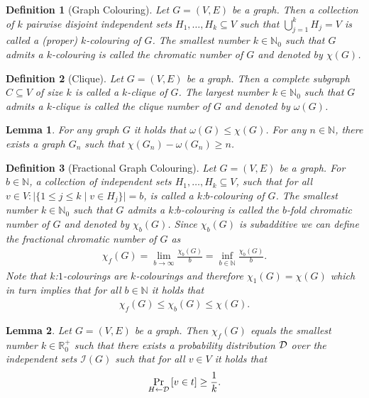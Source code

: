 \documentclass[12pt]{iopart}
\renewcommand{\1}{\mathds{1}}
\newtheorem{lemma}{Lemma}
\newtheorem{definition}{Definition}
\begin{document}
\begin{definition}[Graph Colouring]
  Let $G=(V,E)$ be a graph. Then a collection of $k$ pairwise disjoint independent sets $H_1, \dots, H_k \subseteq V$ such that $\bigcup_{j=1}^k H_j = V$ is called a \emph{(proper) $k$-colouring} of $G$. The smallest number $k\in\mathbb{N}_0$ such that $G$ admits a $k$-colouring is called the chromatic number of $G$ and denoted by $\chi(G)$.
\end{definition}

\begin{definition}[Clique]
  Let $G=(V,E)$ be a graph.
  Then a complete subgraph $C \subseteq V$ of size $k$ is called a $k$-\emph{clique} of $G$. The largest number $k\in\mathbb{N}_0$ such that $G$ admits a $k$-clique is called the clique number of $G$ and denoted by $\omega(G)$.
\end{definition}

\begin{lemma} \label{lem:gap}
  For any graph $G$ it holds that $\omega(G) \leq \chi(G)$.
  For any $n\in\mathbb{N}$, there exists a graph $G_n$ such that $\chi(G_n) - \omega(G_n) \geq n$.
\end{lemma}

\begin{definition}[Fractional Graph Colouring]\label{def:fractional_chromatic_number}
  Let $G=(V,E)$ be a graph. For $b \in \mathbb{N}$, a collection of independent sets $H_1, \dots, H_k \subseteq V$, such that for all $v \in V : |\{ 1 \leq j \leq k \; | \; v \in H_j \}| = b$, is called a \emph{$k$:$b$-colouring} of $G$.
  The smallest number $k \in \mathbb{N}_0$ such that $G$ admits a \emph{$k$:$b$-colouring} is called the $b$-fold chromatic number of $G$ and denoted by $\chi_b(G)$.
  Since $\chi_b(G)$ is subadditive we can define the \emph{fractional chromatic number} of $G$ as
  \begin{align}
    \chi_f(G) = \lim_{b \to \infty} \frac{\chi_b(G)}{b} = \inf_{b \in \mathbb{N}} \frac{\chi_b(G)}{b}.
  \end{align}
  Note that $k$:$1$-colourings are $k$-colourings and therefore $\chi_1(G) = \chi(G)$ which in turn implies that for all $b \in \mathbb{N}$ it holds that
  \begin{align}
    \chi_f(G) \leq \chi_b(G) \leq \chi(G).
  \end{align}
\end{definition}

\begin{lemma}\label{lemma:fractional_chromatic_number_probabilistic} Let $G=(V,E)$ be a graph.
  Then $\chi_f(G)$ equals the smallest number $k \in \mathbb{R}^+_0$ such that there exists a probability distribution $\mathcal{D}$ over the independent sets $\mathcal I(G)$ such that for all $v \in V$ it holds that
  \begin{align}
    \Pr_{H \gets \mathcal{D}} \left[ v \in t \right] \geq \frac{1}{k}.
  \end{align}
\end{lemma}
\end{document}
